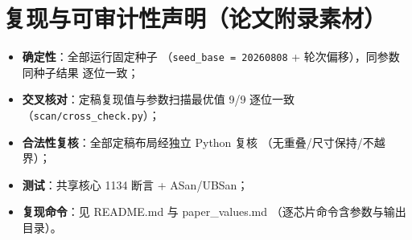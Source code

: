 \documentclass[12pt,a4paper]{article}
\begin{document}
\section{复现与可审计性声明（论文附录素材）}

\begin{itemize}
    \item \textbf{确定性}：全部运行固定种子
    （\texttt{seed\_base = 20260808} + 轮次偏移），同参数同种子结果
    逐位一致；
    \item \textbf{交叉核对}：定稿复现值与参数扫描最优值 9/9 逐位一致
    （\texttt{scan/cross\_check.py}）；
    \item \textbf{合法性复核}：全部定稿布局经独立 Python 复核
    （无重叠/尺寸保持/不越界）；
    \item \textbf{测试}：共享核心 1134 断言 + ASan/UBSan；
    \item \textbf{复现命令}：见 README.md 与 paper\_values.md
    （逐芯片命令含参数与输出目录）。
\end{itemize}
\end{document}
